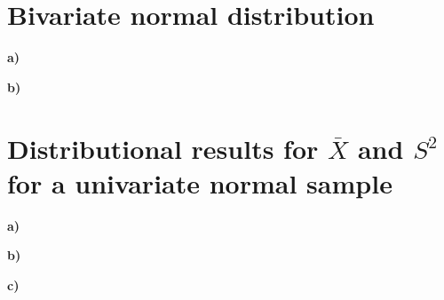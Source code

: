 \documentclass[11pt, a4paper, english]{NTNUoving}
\begin{document}
%

\section*{Bivariate normal distribution}
\textbf{a)}

\textbf{b)}


\section*{Distributional results for $\bar{X}$ and $S^2$ for a univariate normal sample}
\textbf{a)}

\textbf{b)}

\textbf{c)}

\end{document}
